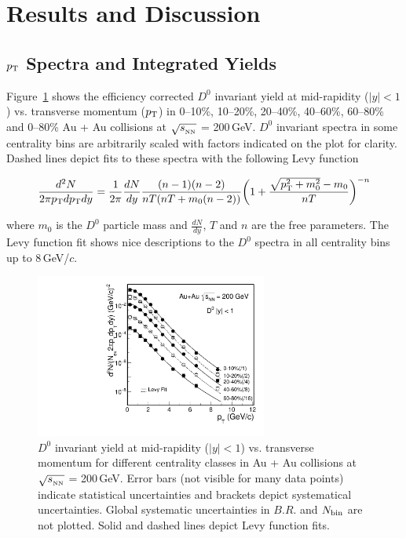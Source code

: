 \clearpage

\section{\label{result}Results and Discussion}

\subsection{\label{result:pt}$p_{\rm T}$ Spectra and Integrated Yields}

Figure~\ref{D0_spectra} shows the efficiency corrected $D^0$ invariant yield at mid-rapidity ($|y|<1$) vs. transverse momentum ($p_{\rm T}$) in 0--10\%, 10--20\%, 20--40\%, 40--60\%, 60--80\% and 0--80\% Au + Au collisions at $\sqrt{s_{_{\rm NN}}}$ = 200\,GeV. $D^0$ invariant spectra in some centrality bins are arbitrarily scaled with factors indicated on the plot for clarity. Dashed lines depict fits to these spectra with the following Levy function

\begin{equation}
\frac{d^2N}{2\pi p_{\rm T}dp_{\rm T}dy} = \frac{1}{2\pi}\frac{dN}{dy}\frac{(n-1)(n-2)}{nT(nT+m_0(n-2))}\bigg(1+\frac{\sqrt{p_{\rm T}^2+m_0^2}-m_0}{nT}\bigg)^{-n}
\end{equation}

where $m_0$ is the $D^0$ particle mass and $\frac{dN}{dy}$, $T$ and $n$ are the free parameters. The Levy function fit shows nice descriptions to the $D^0$ spectra in all centrality bins up to 8\,GeV/$c$.

\begin{figure}
\centering
\includegraphics[width=0.68\textwidth]{figure/Run14_D0HFT/D0_spectra.pdf}
\caption{$D^{0}$ invariant yield at mid-rapidity ($|y|<1$) vs. transverse momentum for different centrality classes in Au + Au collisions at $\sqrt{s_{_{\rm NN}}}$ = 200\,GeV. Error bars (not visible for many data points) indicate statistical uncertainties and brackets depict systematical uncertainties. Global systematic uncertainties in $B.R.$ and $N_{\rm bin}$ are not plotted. Solid and dashed lines depict Levy function fits.}
\label{D0_spectra} 
\end{figure}

